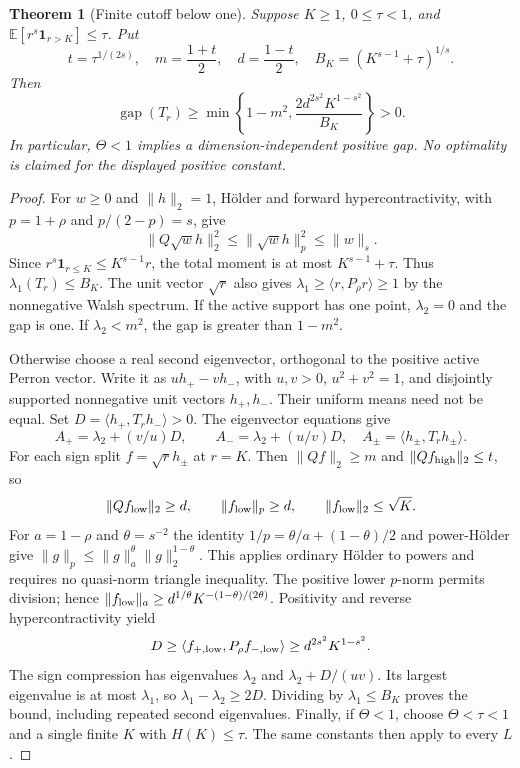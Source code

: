 \documentclass[11pt]{article}
\newtheorem{theorem}{Theorem}
\newcommand{\gap}{\operatorname{gap}}
\begin{document}
\begin{theorem}[Finite cutoff below one]\label{thm:critical-tail}
Suppose $K\ge1$, $0\le\tau<1$, and
$\mathbb E[r^s\mathbf1_{r>K}]\le\tau$. Put
\[
 t=\tau^{1/(2s)},\quad m=\frac{1+t}{2},\quad d=\frac{1-t}{2},\quad
 B_K=(K^{s-1}+\tau)^{1/s}.
\]
Then
\[
 \gap(T_r)\ge
 \min\left\{1-m^2,\frac{2d^{2s^2}K^{1-s^2}}{B_K}\right\}>0.
\]
In particular, $\Theta<1$ implies a dimension-independent positive gap.
No optimality is claimed for the displayed positive constant.
\end{theorem}
\begin{proof}
For $w\ge0$ and $\|h\|_2=1$, H\"older and forward hypercontractivity,
with $p=1+\rho$ and $p/(2-p)=s$, give
\[
 \|Q\sqrt w h\|_2^2\le\|\sqrt w h\|_p^2\le\|w\|_s.
\]
Since $r^s\mathbf1_{r\le K}\le K^{s-1}r$, the total moment is at most
$K^{s-1}+\tau$. Thus $\lambda_1(T_r)\le B_K$. The unit vector
$\sqrt r$ also gives $\lambda_1\ge\langle r,P_\rho r\rangle\ge1$
by the nonnegative Walsh spectrum.
If the active support has one point, $\lambda_2=0$ and the gap is one.
If $\lambda_2<m^2$, the gap is greater than $1-m^2$.

Otherwise choose a real second eigenvector, orthogonal to the positive
active Perron vector. Write it as $u h_+-v h_-$, with $u,v>0$,
$u^2+v^2=1$, and disjointly supported nonnegative unit vectors
$h_+,h_-$. Their uniform means need not be equal. Set
$D=\langle h_+,T_rh_-\rangle>0$. The eigenvector equations give
\[
 A_+=\lambda_2+(v/u)D,\qquad A_-=\lambda_2+(u/v)D,
 \quad A_\pm=\langle h_\pm,T_rh_\pm\rangle.
\]
For each sign split $f=\sqrt r h_\pm$ at $r=K$. Then
$\|Qf\|_2\ge m$ and $\|Qf_{\rm high}\|_2\le t$, so
\[
 \|Qf_{\rm low}\|_2\ge d,\qquad
 \|f_{\rm low}\|_p\ge d,\qquad
 \|f_{\rm low}\|_2\le\sqrt K.
\]
For $a=1-\rho$ and $\theta=s^{-2}$ the identity
$1/p=\theta/a+(1-\theta)/2$ and power-H\"older give
$\|g\|_p\le\|g\|_a^\theta\|g\|_2^{1-\theta}$.
This applies ordinary H\"older to powers and requires no quasi-norm
triangle inequality. The positive lower $p$-norm permits division;
hence $\|f_{\rm low}\|_a\ge d^{1/\theta}K^{-(1-\theta)/(2\theta)}$.
Positivity and reverse hypercontractivity yield
\[
 D\ge\langle f_{+,\rm low},P_\rho f_{-,\rm low}\rangle
 \ge d^{2s^2}K^{1-s^2}.
\]
The sign compression has eigenvalues $\lambda_2$ and
$\lambda_2+D/(uv)$. Its largest eigenvalue is at most $\lambda_1$,
so $\lambda_1-\lambda_2\ge2D$. Dividing by $\lambda_1\le B_K$
proves the bound, including repeated second eigenvalues.
Finally, if $\Theta<1$, choose $\Theta<\tau<1$ and a single finite
$K$ with $H(K)\le\tau$. The same constants then apply to every $L$.
\end{proof}
\end{document}
